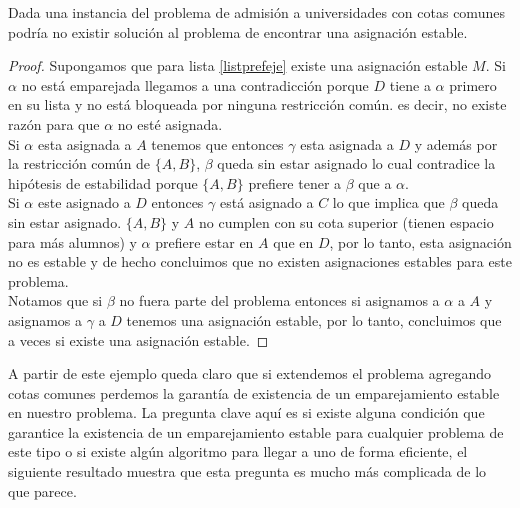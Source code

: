 \begin{teo} \cite{Todo}
\label{ejemplo teorema}
Dada una instancia del problema de admisión a universidades con cotas comunes podría no existir solución al problema de encontrar una asignación estable.
\end{teo}
\begin{proof}
Supongamos que para lista \ref{listprefeje} existe una asignación estable $M$. Si $\alpha$ no está emparejada llegamos a una contradicción porque $D$ tiene a $\alpha$ primero en su lista y no está bloqueada por ninguna restricción común. es decir, no existe razón para que $\alpha$ no esté asignada. \\ Si $\alpha$ esta asignada a $A$ tenemos que entonces $\gamma$ esta asignada a $D$ y además por la restricción común de $\{A,B\}$, $\beta$ queda sin estar asignado lo cual contradice la hipótesis de estabilidad porque $\{A,B\}$ prefiere tener a $\beta$ que a $\alpha$. \\ Si $\alpha$ este asignado a $D$ entonces $\gamma$ está asignado a $C$ lo que implica que $\beta$ queda sin estar asignado. $\{A,B\}$ y $A$ no cumplen con su cota superior (tienen espacio para más alumnos) y $\alpha$ prefiere estar en $A$ que en $D$, por lo tanto, esta asignación no es estable y de hecho concluimos que no existen asignaciones estables para este problema. \\
Notamos que si $\beta$ no fuera parte del problema entonces si asignamos a $\alpha$ a $A$ y asignamos a $\gamma$ a $D$ tenemos una asignación estable, por lo tanto, concluimos que a veces si existe una asignación estable. 
\end{proof}


A partir de este ejemplo queda claro que si extendemos el problema agregando cotas comunes perdemos la garantía de existencia de un emparejamiento estable en nuestro problema. La pregunta clave aquí es si existe alguna condición que garantice la existencia de un emparejamiento estable para cualquier problema de este tipo o si existe algún algoritmo para llegar a uno de forma eficiente, el siguiente resultado muestra que esta pregunta es mucho más complicada de lo que parece. 

